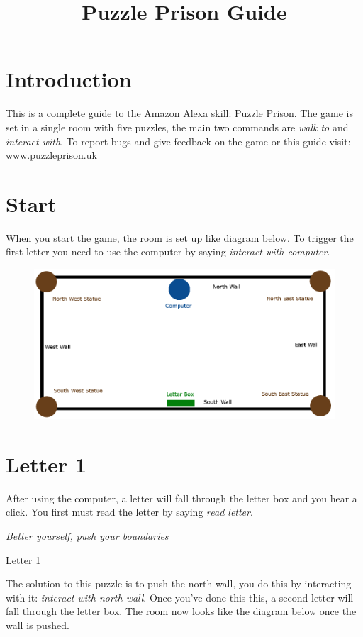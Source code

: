 \documentclass{article}
\begin{document}
\title{Puzzle Prison Guide}
\date{}
\maketitle

\section*{Introduction}
This is a complete guide to the Amazon Alexa skill: Puzzle Prison. 
The game is set in a single room with five puzzles, the main two commands are \textit{walk to} and \textit{interact with}. 
To report bugs and give feedback on the game or this guide visit: \url{www.puzzleprison.uk}

\section*{Start}
When you start the game, the room is set up like diagram below.
To trigger the first letter you need to use the computer by saying \textit{interact with computer}.

\begin{figure}[htb]
	\centering
	\includegraphics[width=6in]{RoomLayout1.png}
\end{figure}

\newpage
\section*{Letter 1}
After using the computer, a letter will fall through the letter box and you hear a click.
You first must read the letter by saying \textit{read letter}.

\epigraph{\textit{Better yourself, push your boundaries}}{Letter 1}

The solution to this puzzle is to push the north wall, you do this by interacting with it: \textit{interact with north wall}.
Once you've done this this, a second letter will fall through the letter box.
The room now looks like the diagram below once the wall is pushed.
\end{document}
